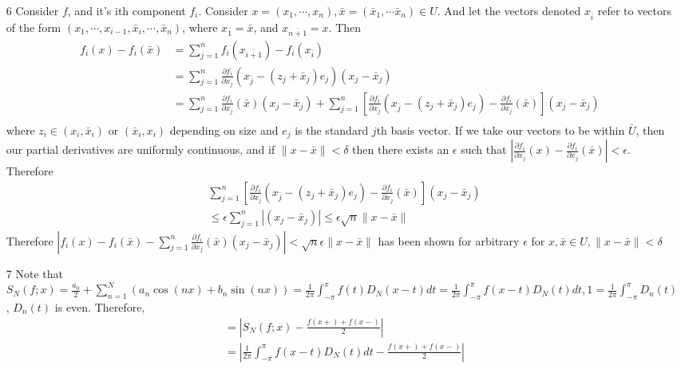 \documentclass[12pt, letterpaper]{article}
\begin{document}
\begin{enumerate}
	\item[6] Consider $f$, and it's ith component $f_i$.  
	Consider $x = (x_1,\cdots,x_n), \bar{x} = (\bar{x}_1,\cdots \bar{x}_n) \in U$.  And let the vectors denoted $x_{\bar{i}}$
	refer to vectors of the form $(x_1,\cdots, x_{i-1}, \bar{x}_i,\cdots, \bar{x}_n)$, where $x_{\bar{1}} = \bar{x}$, and $x_{\bar{n+1}}= x$.
	Then 
	\begin{align*}
		f_i(x) - f_i(\bar{x}) &= \sum_{j=1}^n f_i(x_{\bar{i+1}}) - 
		f_i(x_{\bar{i}}) \\
		&= \sum_{j=1}^n \frac{\partial f_i}{\partial x_j} ( x_{\bar{j}} - (z_j + \bar{x}_{j})e_j) (x_j - \bar{x}_j)\\
		&= \sum_{j=1}^n \frac{\partial f_i}{\partial x_j}(\bar{x})(x_j - \bar{x}_j) + \sum_{j=1}^n [\frac{\partial f_i}{\partial x_j} ( x_{\bar{j}} - (z_j + \bar{x}_{j})e_j)  - \frac{\partial f_i}{\partial x_j} (\bar{x})] (x_j - \bar{x}_j)\\  
	\end{align*}
	where $z_i \in (x_i,\bar{x}_i)$ or $(\bar{x}_i,x_i)$  
	depending on size and 
	$e_j$ is the standard $j$th basis vector.  If we take our vectors to be within 
	$\bar{U}$, then our partial derivatives are uniformly continuous, and if $\| x - \bar{x}\| < \delta$ then there exists 
	an $\epsilon$ such that $|\frac{\partial f_i}{\partial x_j}(x) - \frac{\partial f_i}{\partial x_j}(\bar{x})| < \epsilon$.  Therefore 
	\begin{align*}
	& \sum_{j=1}^n [\frac{\partial f_i}{\partial x_j} ( x_{\bar{j}} - (z_j + \bar{x}_{j})e_j)  - \frac{\partial f_i}{\partial x_j} (\bar{x})] (x_j - \bar{x}_j)\\
	&\leq \epsilon \sum_{j=1}^n |(x_j - \bar{x}_j)| \leq \epsilon \sqrt{n} \|x - \bar{x} \|
	\end{align*}
	Therefore $|f_i(x) - f_i(\bar{x}) - \sum_{j=1}^n \frac{\partial f_i}{\partial x_j}(\bar{x})(x_j - \bar{x}_j)| < \sqrt{n}\epsilon \|x - \bar{x}\|$ has been shown for arbitrary $\epsilon$ for $x,\bar{x} \in U, \|x - \bar{x}\| < \delta$
	\item[7] Note that 
	$S_N(f;x) = \frac{a_0}{2} + \sum_{n=1}^N(a_n \cos(nx) + b_n \sin(nx)) = \frac{1}{2\pi}\int_{-\pi}^\pi f(t) D_N(x-t) dt
	=\frac{1}{2\pi}\int_{-\pi}^\pi f(x-t) D_N(t) dt,
	1 = \frac{1}{2\pi}\int_{-\pi}^\pi D_n(t)$,
	$D_n(t)$ is even.  Therefore,
	\begin{align*}
		&= |S_N(f;x) - \frac{f(x+) + f(x-)}{2}|\\
		&= |\frac{1}{2\pi}\int_{-\pi}^\pi f(x-t) D_N(t) dt- \frac{f(x+) + f(x-)}{2}|\\

\end{align*}
\end{enumerate}
\end{document}
